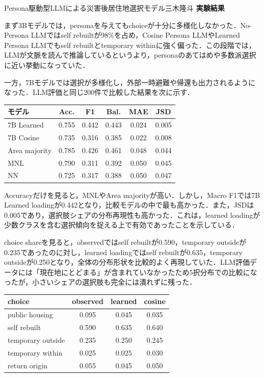 \begin{column}{Persona駆動型LLMによる災害後居住地選択モデル}{三木隆斗}
\medskip
\noindent
\textbf{実験結果}

まず3Bモデルでは，personaを与えてもchoiceが十分に多様化しなかった．No-Persona LLMではself rebuiltが98\%を占め，Cosine Persona LLMやLearned Persona LLMでもself rebuiltとtemporary withinに強く偏った．この段階では，LLMが文脈を読んで推論しているというより，personaのあてはめや多数派選択に近い挙動になっていた．

一方，7Bモデルでは選択が多様化し，外部一時避難や帰還も出力されるようになった．LLM評価と同じ200件で比較した結果を次に示す．

\begin{center}
\scriptsize
\begin{tabular}{lccccc}
\toprule
モデル & Acc. & F1 & Bal. & MAE & JSD \\
\midrule
7B Learned & 0.755 & 0.442 & 0.443 & 0.024 & 0.005 \\
7B Cosine & 0.735 & 0.316 & 0.385 & 0.022 & 0.008 \\
Area majority & 0.785 & 0.426 & 0.461 & 0.048 & 0.044 \\
MNL & 0.790 & 0.311 & 0.392 & 0.050 & 0.045 \\
NN & 0.725 & 0.317 & 0.388 & 0.050 & 0.047 \\
\bottomrule
\end{tabular}
\end{center}

Accuracyだけを見ると，MNLやArea majorityが高い．しかし，Macro F1では7B Learned loadingが0.442となり，比較モデルの中で最も高かった．また，JSDは0.005であり，選択肢シェアの分布再現性も高かった．これは，learned loadingが少数クラスを含む選択傾向を捉える上で有効であったことを示している．

choice shareを見ると，observedではself rebuiltが0.590，temporary outsideが0.235であったのに対し，learned loadingではself rebuiltが0.635，temporary outsideが0.250となり，全体の分布形状を比較的よく再現していた．LLM評価データには「現在地にとどまる」が含まれていなかったため5択分布での比較になったが，小さいシェアの選択肢も完全には潰れずに残った．

\begin{center}
\scriptsize
\begin{tabular}{lccc}
\toprule
choice & observed & learned & cosine \\
\midrule
public housing & 0.095 & 0.045 & 0.035 \\
self rebuilt & 0.590 & 0.635 & 0.640 \\
temporary outside & 0.235 & 0.250 & 0.245 \\
temporary within & 0.025 & 0.025 & 0.030 \\
return origin & 0.055 & 0.045 & 0.050 \\
\bottomrule
\end{tabular}
\end{center}


\end{column}
